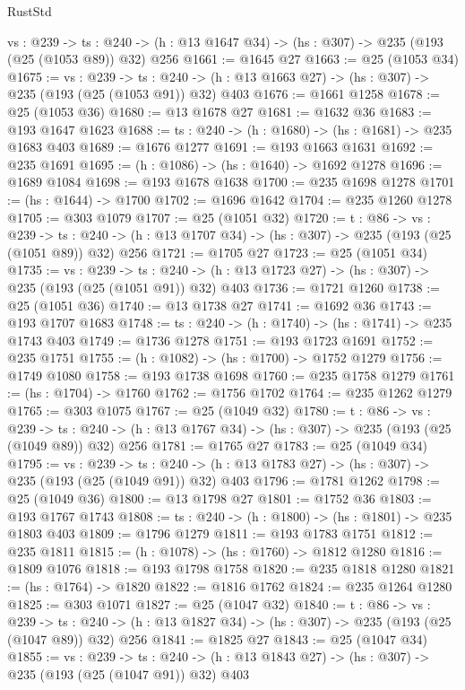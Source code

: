 \begin{lexlean}{RustStd}
\begin{coremodule}
{\begin{coremodule}
{{{{  {vs : @239} ->
  {ts : @240} -> (h : @13 @1647 @34) -> (hs : @307) -> @235 (@193 (@25 (@1053 @89)) @32) @256
@1661 := @1645 @27
@1663 := @25 (@1053 @34)
@1675 := {vs : @239} ->
  {ts : @240} -> (h : @13 @1663 @27) -> (hs : @307) -> @235 (@193 (@25 (@1053 @91)) @32) @403
@1676 := @1661 @1258
@1678 := @25 (@1053 @36)
@1680 := @13 @1678 @27
@1681 := @1632 @36
@1683 := @193 @1647 @1623
@1688 := {ts : @240} -> (h : @1680) -> (hs : @1681) -> @235 @1683 @403
@1689 := @1676 @1277
@1691 := @193 @1663 @1631
@1692 := @235 @1691
@1695 := (h : @1086) -> (hs : @1640) -> @1692 @1278
@1696 := @1689 @1084
@1698 := @193 @1678 @1638
@1700 := @235 @1698 @1278
@1701 := (hs : @1644) -> @1700
@1702 := @1696 @1642
@1704 := @235 @1260 @1278
@1705 := @303 @1079
@1707 := @25 (@1051 @32)
@1720 := {t : @86} ->
  {vs : @239} ->
  {ts : @240} -> (h : @13 @1707 @34) -> (hs : @307) -> @235 (@193 (@25 (@1051 @89)) @32) @256
@1721 := @1705 @27
@1723 := @25 (@1051 @34)
@1735 := {vs : @239} ->
  {ts : @240} -> (h : @13 @1723 @27) -> (hs : @307) -> @235 (@193 (@25 (@1051 @91)) @32) @403
@1736 := @1721 @1260
@1738 := @25 (@1051 @36)
@1740 := @13 @1738 @27
@1741 := @1692 @36
@1743 := @193 @1707 @1683
@1748 := {ts : @240} -> (h : @1740) -> (hs : @1741) -> @235 @1743 @403
@1749 := @1736 @1278
@1751 := @193 @1723 @1691
@1752 := @235 @1751
@1755 := (h : @1082) -> (hs : @1700) -> @1752 @1279
@1756 := @1749 @1080
@1758 := @193 @1738 @1698
@1760 := @235 @1758 @1279
@1761 := (hs : @1704) -> @1760
@1762 := @1756 @1702
@1764 := @235 @1262 @1279
@1765 := @303 @1075
@1767 := @25 (@1049 @32)
@1780 := {t : @86} ->
  {vs : @239} ->
  {ts : @240} -> (h : @13 @1767 @34) -> (hs : @307) -> @235 (@193 (@25 (@1049 @89)) @32) @256
@1781 := @1765 @27
@1783 := @25 (@1049 @34)
@1795 := {vs : @239} ->
  {ts : @240} -> (h : @13 @1783 @27) -> (hs : @307) -> @235 (@193 (@25 (@1049 @91)) @32) @403
@1796 := @1781 @1262
@1798 := @25 (@1049 @36)
@1800 := @13 @1798 @27
@1801 := @1752 @36
@1803 := @193 @1767 @1743
@1808 := {ts : @240} -> (h : @1800) -> (hs : @1801) -> @235 @1803 @403
@1809 := @1796 @1279
@1811 := @193 @1783 @1751
@1812 := @235 @1811
@1815 := (h : @1078) -> (hs : @1760) -> @1812 @1280
@1816 := @1809 @1076
@1818 := @193 @1798 @1758
@1820 := @235 @1818 @1280
@1821 := (hs : @1764) -> @1820
@1822 := @1816 @1762
@1824 := @235 @1264 @1280
@1825 := @303 @1071
@1827 := @25 (@1047 @32)
@1840 := {t : @86} ->
  {vs : @239} ->
  {ts : @240} -> (h : @13 @1827 @34) -> (hs : @307) -> @235 (@193 (@25 (@1047 @89)) @32) @256
@1841 := @1825 @27
@1843 := @25 (@1047 @34)
@1855 := {vs : @239} ->
  {ts : @240} -> (h : @13 @1843 @27) -> (hs : @307) -> @235 (@193 (@25 (@1047 @91)) @32) @403
}}}}
\end{coremodule}}
\end{coremodule}
\end{lexlean}
